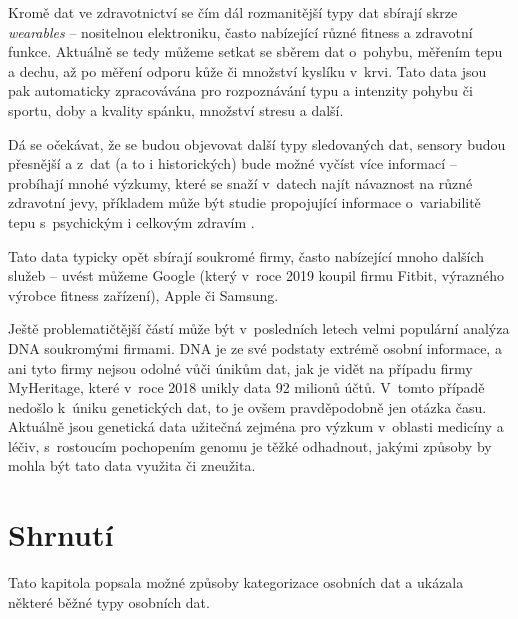 Kromě dat ve zdravotnictví se čím dál rozmanitější typy dat sbírají skrze \textit{wearables} -- nositelnou elektroniku, často nabízející různé fitness a zdravotní funkce. Aktuálně se tedy můžeme setkat se sběrem dat o~pohybu, měřením tepu a dechu, až po měření odporu kůže či množství kyslíku v~krvi.
Tato data jsou pak automaticky zpracovávána pro rozpoznávání typu a intenzity pohybu či sportu, doby a kvality spánku, množství stresu a další.

Dá se očekávat, že se budou objevovat další typy sledovaných dat, sensory budou přesnější a z~dat (a to i historických) bude možné vyčíst více informací -- probíhají mnohé výzkumy, které se snaží v~datech najít návaznost na různé zdravotní jevy, příkladem může být studie propojující informace o~variabilitě tepu s~psychickým i celkovým zdravím \citep{heart-rate-health}.

Tato data typicky opět sbírají soukromé firmy, často nabízející mnoho dalších služeb -- uvést můžeme Google (který v~roce 2019 koupil firmu Fitbit, výrazného výrobce fitness zařízení), Apple či Samsung.

Ještě problematičtější částí může být v~posledních letech velmi populární analýza DNA soukromými firmami. DNA je ze své podstaty extrémě osobní informace, a ani tyto firmy nejsou odolné vůči únikům dat, jak je vidět na případu firmy MyHeritage, které v~roce 2018 unikly data 92 milionů účtů. V~tomto případě nedošlo k~úniku genetických dat, to je ovšem pravděpodobně jen otázka času. Aktuálně jsou genetická data užitečná zejména pro výzkum v~oblasti medicíny a léčiv, s~rostoucím pochopením genomu je těžké odhadnout, jakými způsoby by mohla být tato data využita či zneužita.


\section*{Shrnutí}
Tato kapitola popsala možné způsoby kategorizace osobních dat a ukázala některé běžné typy osobních dat.